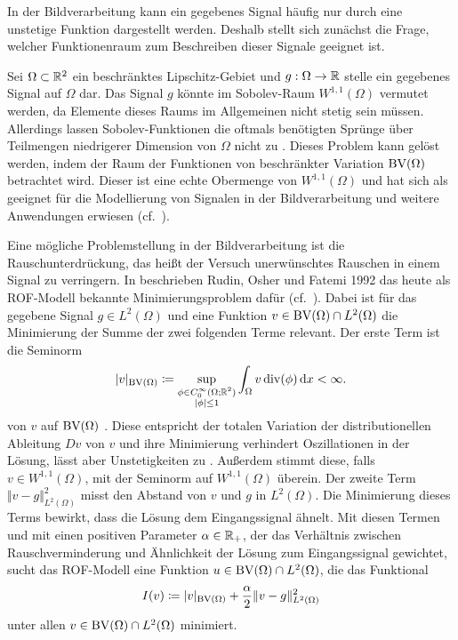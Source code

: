 In der Bildverarbeitung kann ein gegebenes Signal häufig nur durch eine
unstetige Funktion dargestellt werden. Deshalb stellt sich zunächst die Frage,
welcher Funktionenraum zum Beschreiben dieser Signale geeignet ist.

Sei $\Omega\subset\mathbb{R}^2$ ein beschränktes Lipschitz-Gebiet und $g:\Omega\to
\mathbb{R}$ stelle ein gegebenes Signal auf $\Omega$ dar. Das Signal $g$ könnte im
Sobolev-Raum $W^{1,1}(\Omega)$ vermutet werden, da Elemente dieses Raums im
Allgemeinen nicht stetig sein müssen. 
Allerdings lassen Sobolev-Funktionen die oftmals benötigten Sprünge über
Teilmengen niedrigerer Dimension von $\Omega$ nicht zu
\cite[297]{Bar15}.
Dieses Problem kann gelöst werden, indem der Raum der Funktionen von
beschränkter Variation $\textup{BV}(\Omega)$ betrachtet wird. Dieser ist eine echte
Obermenge von $W^{1,1}(\Omega)$ und hat sich als geeignet für die Modellierung 
von Signalen in der Bildverarbeitung und weitere Anwendungen erwiesen (cf.\
\cites[393]{ABM14}[42]{AK06}[297]{Bar15}[S. 1 f.]{Bra98}).

Eine mögliche Problemstellung in der Bildverarbeitung ist die 
Rauschunterdrü\-ckung, das heißt der Versuch unerwünschtes Rauschen in einem
Signal zu verringern.
In \cite{ROF92} beschrieben Rudin, Osher und Fatemi 1992 das heute als
ROF-Modell bekannte Minimierungsproblem dafür (cf.\
\cites[1217]{Bar15a}[132]{CP10}[S. 74 f.]{Get12}).
Dabei ist für das gegebene Signal $g\in L^2(\Omega)$ und 
eine Funktion $v\in\textup{BV}(\Omega)\cap L^2(\Omega)$ die Minimierung
der Summe der zwei folgenden Terme relevant.
Der erste Term ist die
Seminorm
\begin{align*}
  |v|_{\textup{BV}(\Omega)}
  \coloneqq
  \sup_{\substack{\phi\in C^\infty_0(\Omega;\mathbb{R}^2)\\
  |\phi|\leq 1}}\int_\Omega v\operatorname{div} (\phi)\,\mathrm{d}x
  <
  \infty.
\end{align*}
von $v$ auf $\textup{BV}(\Omega)$ \cite[1162]{Bar12}. Diese entspricht der
totalen Variation der distributionellen Ableitung $Dv$ von $v$ und
ihre Minimierung verhindert Oszillationen in der Lösung, lässt aber
Unstetigkeiten zu \cite[72]{Get12}.
Außerdem stimmt diese, falls $v\in W^{1,1}(\Omega)$, mit der Seminorm auf
$W^{1,1}(\Omega)$ überein. Der zweite Term 
$\Vert v-g\Vert_{L^2(\Omega)}^2$ misst den Abstand von $v$ und $g$ in
$L^2(\Omega)$. Die Minimierung dieses Terms bewirkt, dass die Lösung
dem Eingangssignal ähnelt.
Mit diesen Termen und mit einen positiven Parameter
$\alpha\in\mathbb{R}_+$, der das Verhältnis zwischen Rauschverminderung und
Ähnlichkeit der Lösung zum Eingangssignal gewichtet, sucht das ROF-Modell
eine Funktion $u\in\textup{BV}(\Omega)\cap L^2(\Omega)$, die das Funktional
\begin{align}
  \label{eq:rofModel}
  I(v)\coloneqq |v|_{\textup{BV}(\Omega)}+\frac{\alpha}{2}\Vert
  v-g\Vert_{L^2(\Omega)}^2
\end{align}
unter allen $v\in\textup{BV}(\Omega)\cap L^2(\Omega)$ minimiert.

